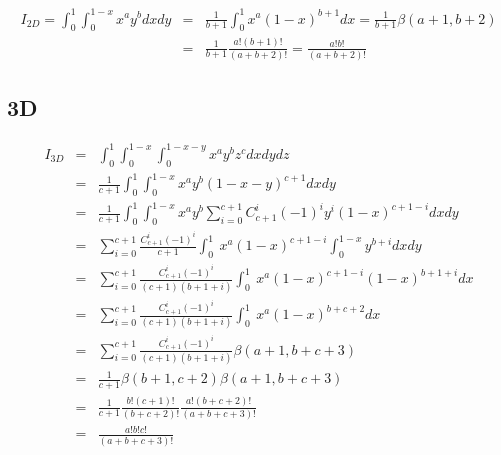 \documentclass[12pt]{article}
\begin{document}
\begin{eqnarray*}
	I_{2D} = \int_0^1 \int_0^{1-x} x^{a} y^{b} dx dy
	& = & \frac{1}{b+1} \int_0^1 x^{a} (1-x)^{b+1} dx = \frac{1}{b+1} \beta(a + 1, b + 2) \\
	& = & \frac{1}{b+1} \frac{a!(b+1)!}{(a+b+2)!} = \frac{a!b!}{(a+b+2)!}
\end{eqnarray*}

\subsection{3D}

\begin{eqnarray*}
	I_{3D}
	& = & \int_0^1 \int_0^{1-x} \int_0^{1-x-y} x^a y^b z^c dx dy dz \\
	& = & \frac{1}{c+1} \int_0^1 \int_0^{1-x} x^a y^b (1-x-y)^{c+1} dx dy \\
	& = & \frac{1}{c+1} \int_0^1 \int_0^{1-x} x^a y^b \sum_{i=0}^{c+1} C_{c+1}^i (-1)^i y^i (1-x)^{c+1-i} dx dy \\
	& = & \sum_{i=0}^{c+1} \frac{C_{c+1}^i (-1)^i}{c+1} \int_0^1 \ x^a (1-x)^{c+1-i} \int_0^{1-x} y^{b+i} dx dy \\
	& = & \sum_{i=0}^{c+1} \frac{C_{c+1}^i (-1)^i}{(c+1)(b+1+i)} \int_0^1 \ x^a (1-x)^{c+1-i} (1-x)^{b+1+i} dx \\
	& = & \sum_{i=0}^{c+1} \frac{C_{c+1}^i (-1)^i}{(c+1)(b+1+i)} \int_0^1 \ x^a (1-x)^{b+c+2} dx \\
	& = & \sum_{i=0}^{c+1} \frac{C_{c+1}^i (-1)^i}{(c+1)(b+1+i)} \beta(a+1, b+c+3) \\
	& = & \frac{1}{c+1} \beta(b+1,c+2) \beta(a+1, b+c+3) \\
	& = & \frac{1}{c+1} \frac{b!(c+1)!}{(b+c+2)!} \frac{a! (b+c+2)!}{(a+b+c+3)!} \\
	& = &  \frac{a! b! c!}{(a+b+c+3)!}
\end{eqnarray*}
\end{document}
